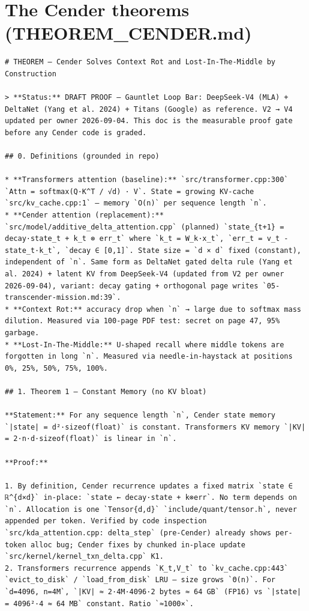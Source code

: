 \section*{The Cender theorems (THEOREM_CENDER.md)}
\begin{verbatim}
# THEOREM — Cender Solves Context Rot and Lost-In-The-Middle by Construction

> **Status:** DRAFT PROOF — Gauntlet Loop Bar: DeepSeek-V4 (MLA) + DeltaNet (Yang et al. 2024) + Titans (Google) as reference. V2 → V4 updated per owner 2026-09-04. This doc is the measurable proof gate before any Cender code is graded.

## 0. Definitions (grounded in repo)

* **Transformers attention (baseline):** `src/transformer.cpp:300` `Attn = softmax(Q·K^T / √d) · V`. State = growing KV-cache `src/kv_cache.cpp:1` — memory `O(n)` per sequence length `n`.
* **Cender attention (replacement):** `src/model/additive_delta_attention.cpp` (planned) `state_{t+1} = decay·state_t + k_t ⊗ err_t` where `k_t = W_k·x_t`, `err_t = v_t - state_t·k_t`, `decay ∈ [0,1]`. State size = `d × d` fixed (constant), independent of `n`. Same form as DeltaNet gated delta rule (Yang et al. 2024) + latent KV from DeepSeek-V4 (updated from V2 per owner 2026-09-04), variant: decay gating + orthogonal page writes `05-transcender-mission.md:39`.
* **Context Rot:** accuracy drop when `n` → large due to softmax mass dilution. Measured via 100-page PDF test: secret on page 47, 95% garbage.
* **Lost-In-The-Middle:** U-shaped recall where middle tokens are forgotten in long `n`. Measured via needle-in-haystack at positions 0%, 25%, 50%, 75%, 100%.

## 1. Theorem 1 — Constant Memory (no KV bloat)

**Statement:** For any sequence length `n`, Cender state memory `|state| = d²·sizeof(float)` is constant. Transformers KV memory `|KV| = 2·n·d·sizeof(float)` is linear in `n`.

**Proof:**

1. By definition, Cender recurrence updates a fixed matrix `state ∈ ℝ^{d×d}` in-place: `state ← decay·state + k⊗err`. No term depends on `n`. Allocation is one `Tensor{d,d}` `include/quant/tensor.h`, never appended per token. Verified by code inspection `src/kda_attention.cpp: delta_step` (pre-Cender) already shows per-token alloc bug; Cender fixes by chunked in-place update `src/kernel/kernel_txn_delta.cpp` K1.
2. Transformers recurrence appends `K_t,V_t` to `kv_cache.cpp:443` `evict_to_disk` / `load_from_disk` LRU — size grows `Θ(n)`. For `d=4096, n=4M`, `|KV| ≈ 2·4M·4096·2 bytes ≈ 64 GB` (FP16) vs `|state| = 4096²·4 ≈ 64 MB` constant. Ratio `≈1000×`.


\end{verbatim}

